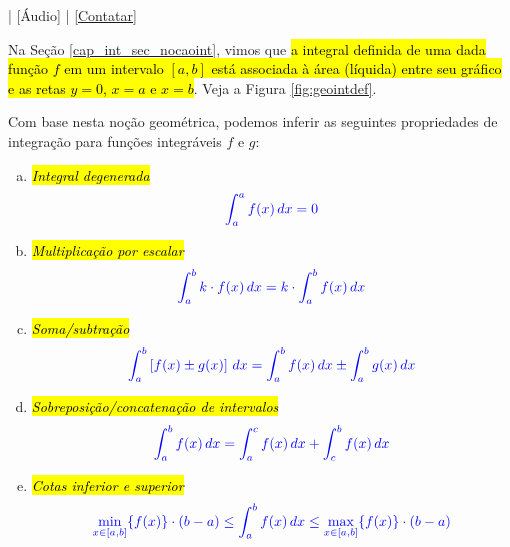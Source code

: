 \begin{flushright}
  [Vídeo] | [Áudio] | \href{https://phkonzen.github.io/notas/contato.html}{[Contatar]}
\end{flushright}

Na Seção \ref{cap_int_sec_nocaoint}, vimos que \hl{a integral definida de uma dada função $f$ em um intervalo $[a, b]$ está associada à área (líquida) entre seu gráfico e as retas $y=0$, $x=a$ e $x=b$}. Veja a Figura \ref{fig:geointdef}.

Com base nesta noção geométrica, podemos inferir as seguintes propriedades de integração para funções integráveis $f$ e $g$:
\begin{enumerate}[a)]
\item \hl{\emph{Integral degenerada}}
  \begin{equation}\color{blue}\int_a^a f(x)\,dx = 0
  \end{equation}
\item \hl{\emph{Multiplicação por escalar}}
  \begin{equation}\color{blue}\int_a^b k\cdot f(x)\,dx = k\cdot\int_a^b f(x)\,dx
  \end{equation}
\item \hl{\emph{Soma/subtração}}
  \begin{equation}\color{blue}\int_a^b \left[f(x)\pm g(x)\right]\,dx = \int_a^b f(x)\,dx \pm \int_a^b g(x)\,dx
  \end{equation}
\item \hl{\emph{Sobreposição/concatenação de intervalos}}
  \begin{equation}\color{blue}\int_a^b f(x)\,dx = \int_a^c f(x)\,dx + \int_c^b f(x)\,dx
  \end{equation}
\item \hl{\emph{Cotas inferior e superior}}
  \begin{equation}\color{blue}\min_{x\in [a, b]} \{f(x)\}\cdot (b-a) \leq \int_a^b f(x)\,dx \leq \max_{x\in [a, b]} \{f(x)\}\cdot (b-a)
  \end{equation}
\end{enumerate}

